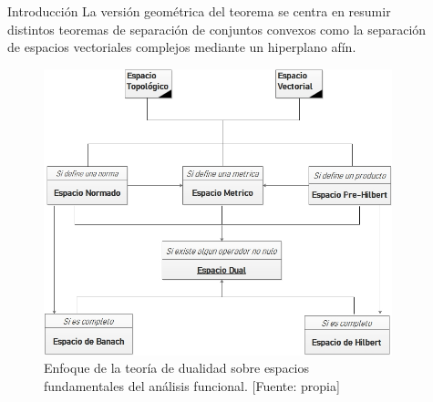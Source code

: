 \documentclass[24pt,final]{beamer}
\newlength{\sepwid}
\newlength{\onecolwid}
\newlength{\twocolwid}
\begin{document}
\begin{frame}[t]
\begin{columns}[t]
\begin{column}{\onecolwid}
\begin{block}{Introducción}
La versión geométrica del teorema  se centra en resumir distintos teoremas de separación de conjuntos convexos como la separación de espacios vectoriales complejos mediante un hiperplano afín. \\[0.7cm]
\end{block}
\begin{figure}
\includegraphics[width=0.98\linewidth]{Pic/ESQUEMA01.jpg}
\caption{Enfoque de la teoría de dualidad sobre espacios fundamentales del análisis funcional. [Fuente: propia] }
\end{figure}



\end{column} %

\begin{column}{\sepwid}\end{column} %

\begin{column}{\twocolwid} %

\begin{columns}[t,totalwidth=\twocolwid] %

\begin{column}{\onecolwid}\vspace{-.6in} %


\end{column}
\end{columns}
\end{column}
\end{columns}
\end{frame}
\end{document}
